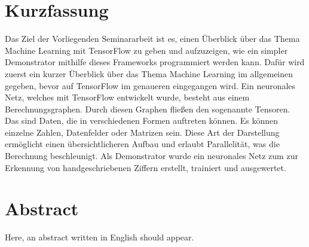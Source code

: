 \section*{Kurzfassung}
Das Ziel der Vorliegenden Seminararbeit ist es, einen Überblick über das Thema Machine Learning mit TensorFlow zu geben und aufzuzeigen, wie ein simpler Demonstrator mithilfe dieses Frameworks programmiert werden kann. Dafür wird zuerst ein kurzer Überblick über das Thema Machine Learning im allgemeinen gegeben, bevor auf TensorFlow im genaueren eingegangen wird. Ein neuronales Netz, welches mit TensorFlow entwickelt wurde, besteht aus einem Berechnungsgraphen. Durch diesen Graphen fließen den sogenannte Tensoren. Das sind Daten, die in verschiedenen Formen auftreten können. Es können einzelne Zahlen, Datenfelder oder Matrizen sein. Diese Art der Darstellung ermöglicht einen übersichtlicheren Aufbau und erlaubt Parallelität, was die Berechnung beschleunigt. Als Demonstrator wurde ein neuronales Netz zum zur Erkennung von handgeschriebenen Ziffern erstellt, trainiert und ausgewertet.
\vfill\vfill\vfill\vfill\vfill\vfill
\section*{Abstract}
Here, an abstract written in English should appear.
\vfill\vfill\vfill\vfill\vfill\vfill